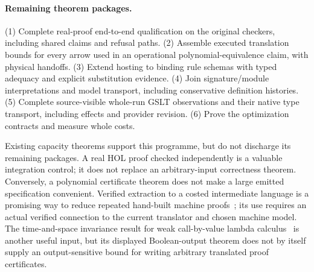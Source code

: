 \documentclass[11pt]{article}
\begin{document}
\paragraph{Remaining theorem packages.}
(1) Complete real-proof end-to-end qualification on the original checkers,
including shared claims and refusal paths.
(2) Assemble executed translation bounds for every arrow used in an
operational polynomial-equivalence claim, with physical handoffs.
(3) Extend hosting to binding rule schemas with typed adequacy and
explicit substitution evidence.
(4) Join signature/module interpretations and model transport, including
conservative definition histories.
(5) Complete source-visible whole-run GSLT observations and their native
type transport, including effects and provider revision.
(6) Prove the optimization contracts and measure whole costs.

Existing capacity theorems support this programme, but do not discharge
its remaining packages. A real HOL proof checked independently is a
valuable integration control; it does not replace an arbitrary-input
correctness theorem. Conversely, a polynomial certificate theorem does
not make a large emitted specification convenient. Verified extraction
to a costed intermediate language is a promising way to reduce repeated
hand-built machine proofs~\cite{forster}; its use requires an actual
verified connection to the current translator and chosen machine model.
The time-and-space invariance result for weak call-by-value lambda
calculus~\cite{reasonable} is another useful input, but its displayed
Boolean-output theorem does not by itself supply an output-sensitive
bound for writing arbitrary translated proof certificates.
\end{document}
